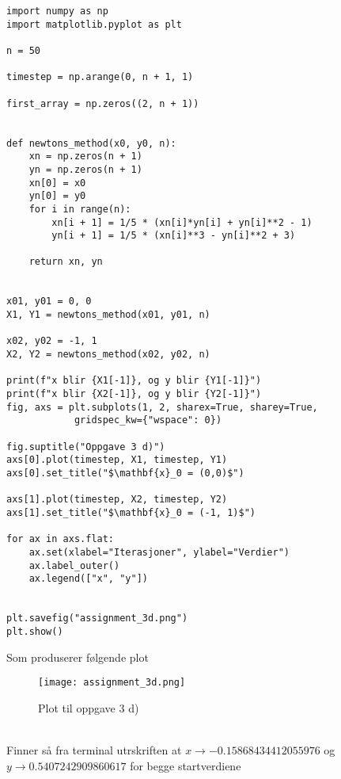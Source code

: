 \documentclass[a4paper,10pt,english]{article}
\begin{document}
	\begin{lstlisting}[caption=Kode til oppgave 3 d]
import numpy as np
import matplotlib.pyplot as plt

n = 50

timestep = np.arange(0, n + 1, 1)

first_array = np.zeros((2, n + 1))


def newtons_method(x0, y0, n):
    xn = np.zeros(n + 1)
    yn = np.zeros(n + 1)
    xn[0] = x0
    yn[0] = y0
    for i in range(n):
        xn[i + 1] = 1/5 * (xn[i]*yn[i] + yn[i]**2 - 1)
        yn[i + 1] = 1/5 * (xn[i]**3 - yn[i]**2 + 3)

    return xn, yn


x01, y01 = 0, 0
X1, Y1 = newtons_method(x01, y01, n)

x02, y02 = -1, 1
X2, Y2 = newtons_method(x02, y02, n)

print(f"x blir {X1[-1]}, og y blir {Y1[-1]}")
print(f"x blir {X2[-1]}, og y blir {Y2[-1]}")
fig, axs = plt.subplots(1, 2, sharex=True, sharey=True,
			gridspec_kw={"wspace": 0})

fig.suptitle("Oppgave 3 d)")
axs[0].plot(timestep, X1, timestep, Y1)
axs[0].set_title("$\mathbf{x}_0 = (0,0)$")

axs[1].plot(timestep, X2, timestep, Y2)
axs[1].set_title("$\mathbf{x}_0 = (-1, 1)$")

for ax in axs.flat:
    ax.set(xlabel="Iterasjoner", ylabel="Verdier")
    ax.label_outer()
    ax.legend(["x", "y"])


plt.savefig("assignment_3d.png")
plt.show()
	\end{lstlisting}
	\newpage
	Som produserer følgende plot\\
	\begin{figure}[h!]
		\centering
		\caption{Plot til oppgave 3 d)}
		\label{fig:3d}
		\texttt{[image: assignment\_3d.png]}
	\end{figure}\\
	Finner så fra terminal utrskriften at $x \rightarrow -0.15868434412055976$ og  $y \rightarrow 0.5407242909860617$ for begge startverdiene
\end{document}

